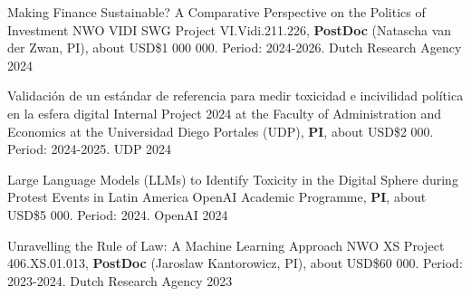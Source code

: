 





\vspace{1mm}

\begin{cvhonors}
\cvhonor
{Making Finance Sustainable? A Comparative Perspective on the Politics of Investment}
{NWO VIDI SWG Project VI.Vidi.211.226, {\bfseries PostDoc} (Natascha van der Zwan, PI), about USD\$1 000 000. Period: 2024-2026.} %
{Dutch Research Agency}
{2024}
\end{cvhonors}

\vspace{1mm}

\begin{cvhonors}
\cvhonor
{Validación de un estándar de referencia para medir toxicidad e incivilidad política en la esfera digital}
{Internal Project 2024 at the Faculty of Administration and Economics at the Universidad Diego Portales (UDP), {\bfseries PI}, about USD\$2 000. Period: 2024-2025.} %
{UDP}
{2024}
\end{cvhonors}

\vspace{1mm}

\begin{cvhonors}
\cvhonor
{Large Language Models (LLMs) to Identify Toxicity in the Digital Sphere during Protest Events in Latin America}
{OpenAI Academic Programme, {\bfseries PI}, about USD\$5 000. Period: 2024.}
{OpenAI}
{2024}
\end{cvhonors}

\vspace{1mm}

\begin{cvhonors}
\cvhonor
{Unravelling the Rule of Law: A Machine Learning Approach}
{NWO XS Project 406.XS.01.013, {\bfseries PostDoc} (Jaroslaw Kantorowicz, PI), about USD\$60 000. Period: 2023-2024.} %
{Dutch Research Agency}
{2023}
\end{cvhonors}

